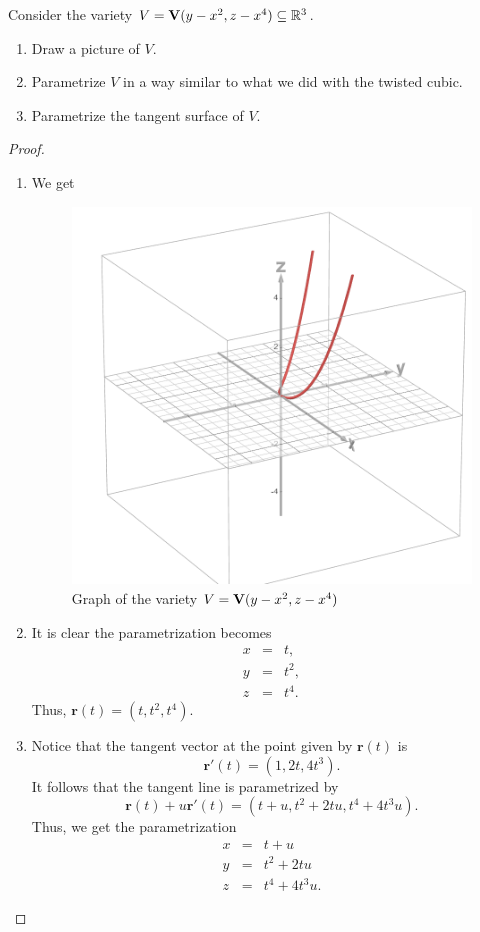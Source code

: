 \begin{exercise}{12}
Consider the variety $V = \mathbf{V}(y-x^2,z-x^4)\subseteq\mathbb{R}^3$.
\begin{enumerate}
    \item Draw a picture of $V$.
    \item Parametrize $V$ in a way similar to what we did with the twisted cubic.
    \item Parametrize the tangent surface of $V$.
\end{enumerate}
\end{exercise}
\begin{proof}
    \begin{enumerate}
        \item We get
        \begin{figure}[H]
            \centering
            \includegraphics[width=0.5\linewidth]{cox-little-oshea/ch1/assets/sec1-3-ex12.png}
            \caption{Graph of the variety $V = \mathbf{V}(y-x^2,z-x^4)$}
            \label{fig:sec1-3-ex12}
        \end{figure}
        \item It is clear the parametrization becomes
        \begin{eqnarray*}
            x & = & t,\\
            y & = & t^2,\\
            z & = & t^4.
        \end{eqnarray*}
        Thus, $\mathbf{r}(t)= (t, t^2, t^4)$.
        \item Notice that the tangent vector at the point given by $\mathbf{r}(t)$ is 
        $$\mathbf{r}'(t) = (1, 2t, 4t^3).$$
        It follows that the tangent line is parametrized by
        $$\mathbf{r}(t) + u\mathbf{r}'(t) = (t + u, t^2 + 2tu, t^4 + 4t^3 u).$$
        Thus, we get the parametrization
        \begin{eqnarray*}
            x & = & t+u\\
            y & = & t^2 + 2tu\\
            z & = & t^4 + 4t^3 u.
        \end{eqnarray*}
    \end{enumerate}
\end{proof}

